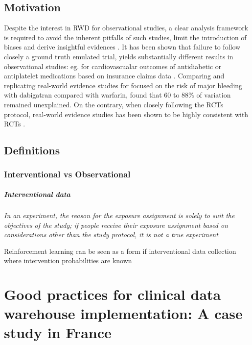 \documentclass{report}
\begin{document}
\section{Motivation}

Despite the interest in RWD for observational studies, a clear analysis
framework is required to avoid the inherent pitfalls of such studies, limit the
introduction of biases and derive insightful evidences \citep{hernan2019second,
  wang2023emulation}. It has been shown that failure to follow closely a ground
truth emulated trial,
yields substantially different results in observational studies: eg. for
cardiovascualar outcomes of antidiabetic or antiplatelet medications based on
insurance claims data \citep{schneeweiss2021conducting}. Comparing and
replicating real-world evidence studies for focused on the risk of major
bleeding
with dabigatran compared with warfarin, \cite{wang2022understanding} found that
60 to 88\% of variation remained unexplained. On the contrary, when closely
following the RCTs protocol, real-world evidence studies has been shown to be
highly consistent with RCTs \citep{wang2023emulation}.
\clearpage

\section{Definitions}

\subsection{Interventional vs Observational}

\paragraph{Interventional data}

\textit{In an experiment, the reason for the exposure assignment is solely to
  suit the objectives of the study; if people receive their exposure assignment
  based on considerations other than the study protocol, it is not a true
  experiment} \citep{rothman2012epidemiology}

Reinforcement learning can be seen as a form if
interventional data collection where intervention probabilities are known
\cite{bareinboim2015bandits}


\chapter{Good practices for clinical data warehouse implementation: A case study
  in France}\label{chap:good_practices}
\end{document}
